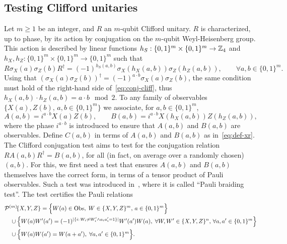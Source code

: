 \subsection{Testing Clifford unitaries}
\label{sec:n-clifford}

Let $m\geq 1$ be an integer, and $R$ an $m$-qubit Clifford unitary. $R$ is characterized, up to phase, by its action by conjugation on the $m$-qubit Weyl-Heisenberg group. This action is described  by linear functions $h_S:\{0,1\}^m\times\{0,1\}^m \to \mathbb{Z}_4$ and $h_X,h_Z:\{0,1\}^m\times\{0,1\}^m \to \{0,1\}^m$ such that
\begin{equation}\label{eq:conj-cliff}
R \sigma_X(a)\sigma_Z(b) R^\dagger = (-1)^{h_S(a,b)}\sigma_X(h_X(a,b))\sigma_Z(h_Z(a,b)),\qquad\forall a,b\in\{0,1\}^m.
\end{equation}
Using that $(\sigma_X(a)\sigma_Z(b))^\dagger = (-1)^{a\cdot b} \sigma_X(a)\sigma_Z(b)$, the same condition must hold of the right-hand side of~\eqref{eq:conj-cliff}, thus $h_X(a,b)\cdot h_Z(a,b) = a\cdot b\mod 2$. 
 To any family of observables $\{X(a),Z(b),\,a,b\in\{0,1\}^m\}$ we associate,  for $a,b\in\{0,1\}^m$,
\begin{equation}\label{eq:def-control-c}
A(a,b) = i^{a\cdot b}X(a)Z(b), \qquad B(a,b) = i^{a\cdot b}X(h_X(a,b))Z(h_Z(a,b)),
\end{equation}
where the phase $i^{a\cdot b}$ is introduced to ensure that $A(a,b)$ and $B(a,b)$ are observables. Define $C(a,b)$ in terms of $A(a,b)$ and $B(a,b)$ as in~\eqref{eq:def-xr}. 
The Clifford conjugation test aims to test for the conjugation relation $RA(a,b)R^\dagger = B(a,b)$, for all (in fact, on average over a randomly chosen) $(a,b)$. For this, we first need a test that ensures $A(a,b)$ and $B(a,b)$ themselves have the correct form, in terms of a tensor product of Pauli observables. Such a test was introduced in~\cite{natarajan2016robust}, where it is called ``Pauli braiding test''. The test certifies the Pauli relations 
\begin{align*}
& {\mathcal{P}^{(m)}\!}\{X,Y,Z\} = \Big\{ W(a)\in\mathrm{Obs},\;W \in \{X,Y,Z\}^m,\,a\in\{0,1\}^m\Big\} \\
&\quad\cup \Big\{W(a)W'(a')=(-1)^{|\{i:\,W_i\neq W'_i \wedge a_ia'_i=1\}|} W'(a')W(a),\;\forall W,W' \in \{X,Y,Z\}^n,\,\forall a,a'\in\{0,1\}^m\Big\}\\
&\quad \cup\Big\{ W(a)W(a')=W(a+a'),\;\forall a,a'\in\{0,1\}^m\Big\}.
\end{align*}
